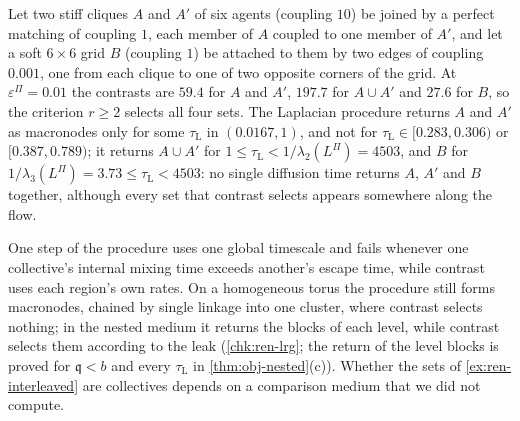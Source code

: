 \begin{example}\label{ex:ren-interleaved}
Let two stiff cliques $A$ and $A'$ of six agents (coupling $10$) be joined by a perfect matching of coupling $1$, each member of $A$ coupled to one member of $A'$, and let a soft $6\times6$ grid $B$ (coupling $1$) be attached to them by two edges of coupling $0.001$, one from each clique to one of two opposite corners of the grid. At $\varepsilon^\Pi=0.01$ the contrasts are $59.4$ for $A$ and $A'$, $197.7$ for $A\cup A'$ and $27.6$ for $B$, so the criterion $r\ge2$ selects all four sets. The Laplacian procedure returns $A$ and $A'$ as macronodes only for some $\tau_{\mathrm L}$ in $(0.0167,1)$, and not for $\tau_{\mathrm L}\in[0.283,0.306)$ or $[0.387,0.789)$; it returns $A\cup A'$ for $1\le\tau_{\mathrm L}<1/\lambda_2(L^\Pi)=4503$, and $B$ for $1/\lambda_3(L^\Pi)=3.73\le\tau_{\mathrm L}<4503$: no single diffusion time returns $A$, $A'$ and $B$ together, although every set that contrast selects appears somewhere along the flow.
\end{example}
One step of the procedure uses one global timescale and fails whenever one collective's internal mixing time exceeds another's escape time, while contrast uses each region's own rates. On a homogeneous torus the procedure still forms macronodes, chained by single linkage into one cluster, where contrast selects nothing; in the nested medium it returns the blocks of each level, while contrast selects them according to the leak (\cref{chk:ren-lrg}; the return of the level blocks is proved for $\mathfrak q<b$ and every $\tau_{\mathrm L}$ in \cref{thm:obj-nested}(c)). Whether the sets of \cref{ex:ren-interleaved} are collectives depends on a comparison medium that we did not compute.


